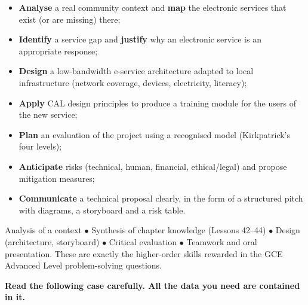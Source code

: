 \documentclass[11pt]{article}
\newcounter{popsec}
\newcounter{popsub}
\newcommand{\courssub}[1]{%
  \stepcounter{popsub}%
  \par\vspace{9pt}\noindent{\popxbold\fontsize{11.5}{13}\selectfont\color{popink}{\color{poporange}\thepopsec.\thepopsub}\hspace{6pt}#1}\par\nopagebreak\vspace{4pt}
}
\begin{document}
\begin{itemize}
\item \textbf{Analyse} a real community context and \textbf{map} the electronic services that exist (or are missing) there;
\item \textbf{Identify} a service gap and \textbf{justify} why an electronic service is an appropriate response;
\item \textbf{Design} a low-bandwidth e-service architecture adapted to local infrastructure (network coverage, devices, electricity, literacy);
\item \textbf{Apply} CAL design principles to produce a training module for the users of the new service;
\item \textbf{Plan} an evaluation of the project using a recognised model (Kirkpatrick's four levels);
\item \textbf{Anticipate} risks (technical, human, financial, ethical/legal) and propose mitigation measures;
\item \textbf{Communicate} a technical proposal clearly, in the form of a structured pitch with diagrams, a storyboard and a risk table.
\end{itemize}

\begin{aretenir}
Analysis of a context $\bullet$ Synthesis of chapter knowledge (Lessons 42--44) $\bullet$ Design (architecture, storyboard) $\bullet$ Critical evaluation $\bullet$ Teamwork and oral presentation. These are exactly the higher-order skills rewarded in the GCE Advanced Level problem-solving questions.
\end{aretenir}

\courssub{Situation}

\textbf{Read the following case carefully. All the data you need are contained in it.}
\end{document}
